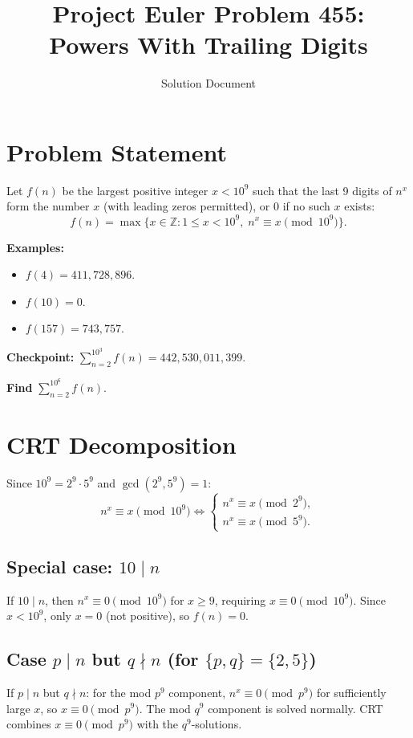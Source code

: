 \documentclass[11pt]{article}
\title{Project Euler Problem 455:\\Powers With Trailing Digits}
\author{Solution Document}
\date{}
\begin{document}
\maketitle

\section{Problem Statement}

Let $f(n)$ be the largest positive integer $x < 10^9$ such that the last 9
digits of $n^x$ form the number $x$ (with leading zeros permitted), or $0$ if
no such $x$ exists:
\[
f(n) = \max\bigl\{x \in \mathbb{Z} : 1 \leq x < 10^9,\; n^x \equiv x \pmod{10^9}\bigr\}.
\]

\textbf{Examples:}
\begin{itemize}
    \item $f(4) = 411{,}728{,}896$.
    \item $f(10) = 0$.
    \item $f(157) = 743{,}757$.
\end{itemize}

\textbf{Checkpoint:} $\sum_{n=2}^{10^3} f(n) = 442{,}530{,}011{,}399$.

\textbf{Find} $\sum_{n=2}^{10^6} f(n)$.

\section{CRT Decomposition}

Since $10^9 = 2^9 \cdot 5^9$ and $\gcd(2^9, 5^9) = 1$:
\[
n^x \equiv x \pmod{10^9} \iff
\begin{cases}
n^x \equiv x \pmod{2^9}, \\
n^x \equiv x \pmod{5^9}.
\end{cases}
\]

\subsection{Special case: $10 \mid n$}

If $10 \mid n$, then $n^x \equiv 0 \pmod{10^9}$ for $x \geq 9$, requiring
$x \equiv 0 \pmod{10^9}$. Since $x < 10^9$, only $x = 0$ (not positive),
so $f(n) = 0$.

\subsection{Case $p \mid n$ but $q \nmid n$ (for $\{p,q\} = \{2,5\}$)}

If $p \mid n$ but $q \nmid n$: for the mod $p^9$ component, $n^x \equiv 0 \pmod{p^9}$
for sufficiently large $x$, so $x \equiv 0 \pmod{p^9}$. The mod $q^9$ component
is solved normally. CRT combines $x \equiv 0 \pmod{p^9}$ with the $q^9$-solutions.
\end{document}
